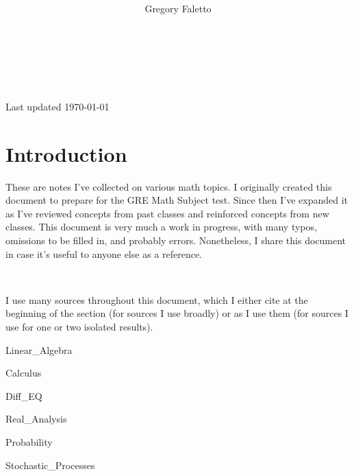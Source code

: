 \documentclass{article}
\title{
    \vspace{2in}
    \textmd{\textbf{ \hmwkTitle}}\\
}
\author{Gregory Faletto}
\date{}
\numberwithin{equation}{section}
\theoremstyle{definition}
\numberwithin{theorem}{section}
\theoremstyle{definition}
\theoremstyle{definition}
\theoremstyle{definition}
\theoremstyle{definition}
\theoremstyle{definition}
\theoremstyle{definition}
\begin{document}
\maketitle

\pagebreak

\tableofcontents

\

\

\begin{center}
Last updated \today
\end{center}



\newpage

\section{Introduction}

These are notes I've collected on various math topics. I originally created this document to prepare for the GRE Math Subject test. Since then I've expanded it as I've reviewed concepts from past classes and reinforced concepts from new classes. This document is very much a work in progress, with many typos, omissions to be filled in, and probably errors. Nonetheless, I share this document in case it's useful to anyone else as a reference.

\

I use many sources throughout this document, which I either cite at the beginning of the section (for sources I use broadly) or as I use them (for sources I use for one or two isolated results).

\pagebreak

{Linear_Algebra}

\pagebreak

{Calculus}

\pagebreak

{Diff_EQ}

\pagebreak

{Real_Analysis}

\pagebreak

{Probability}

\pagebreak

{Stochastic_Processes}

\pagebreak
\end{document}
